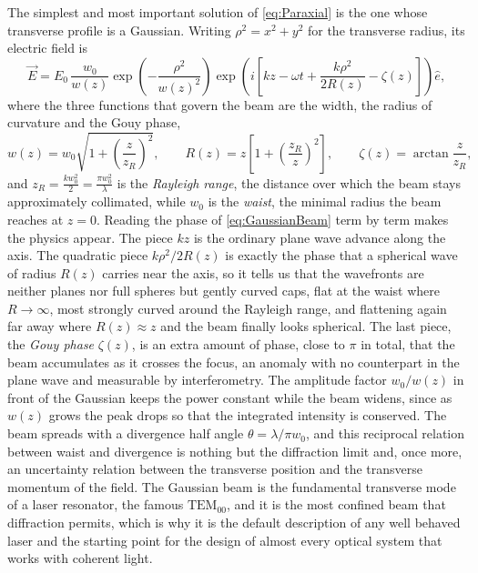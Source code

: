        The simplest and most important solution of \ref{eq:Paraxial} is the one whose transverse profile is a Gaussian. Writing $\rho^2 = x^2+y^2$ for the transverse radius, its electric field is
       \begin{equation}\label{eq:GaussianBeam}
            \vec{E} = E_0\,\frac{w_0}{w(z)}\exp\left(-\frac{\rho^2}{w(z)^2}\right)\exp\left(i\left[kz - \omega t + \frac{k\rho^2}{2R(z)} - \zeta(z)\right]\right)\hat{e},
       \end{equation}
       where the three functions that govern the beam are the width, the radius of curvature and the Gouy phase,
       \begin{equation}
            w(z) = w_0\sqrt{1 + \left(\frac{z}{z_R}\right)^2}, \qquad R(z) = z\left[1 + \left(\frac{z_R}{z}\right)^2\right], \qquad \zeta(z) = \arctan\frac{z}{z_R},
       \end{equation}
       and $z_R = \frac{kw_0^2}{2} = \frac{\pi w_0^2}{\lambda}$ is the \textit{Rayleigh range}, the distance over which the beam stays approximately collimated, while $w_0$ is the \textit{waist}, the minimal radius the beam reaches at $z=0$. Reading the phase of \ref{eq:GaussianBeam} term by term makes the physics appear. The piece $kz$ is the ordinary plane wave advance along the axis. The quadratic piece $k\rho^2/2R(z)$ is exactly the phase that a spherical wave of radius $R(z)$ carries near the axis, so it tells us that the wavefronts are neither planes nor full spheres but gently curved caps, flat at the waist where $R\to\infty$, most strongly curved around the Rayleigh range, and flattening again far away where $R(z)\approx z$ and the beam finally looks spherical. The last piece, the \textit{Gouy phase} $\zeta(z)$, is an extra amount of phase, close to $\pi$ in total, that the beam accumulates as it crosses the focus, an anomaly with no counterpart in the plane wave and measurable by interferometry. The amplitude factor $w_0/w(z)$ in front of the Gaussian keeps the power constant while the beam widens, since as $w(z)$ grows the peak drops so that the integrated intensity is conserved. The beam spreads with a divergence half angle $\theta = \lambda/\pi w_0$, and this reciprocal relation between waist and divergence is nothing but the diffraction limit and, once more, an uncertainty relation between the transverse position and the transverse momentum of the field. The Gaussian beam is the fundamental transverse mode of a laser resonator, the famous $\text{TEM}_{00}$, and it is the most confined beam that diffraction permits, which is why it is the default description of any well behaved laser and the starting point for the design of almost every optical system that works with coherent light.

